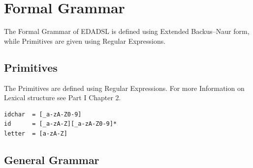 \chapter{Formal Grammar}
The Formal Grammar of EDADSL is defined using Extended Backus–Naur form, while Primitives are given using Regular Expressions.
\section{Primitives}
The Primitives are defined using Regular Expressions. For more Information on Lexical structure see Part I Chapter 2.
\begin{verbatim}
idchar  = [_a-zA-Z0-9]
id      = [_a-zA-Z][_a-zA-Z0-9]*
letter  = [a-zA-Z]
\end{verbatim}

\section{General Grammar}
